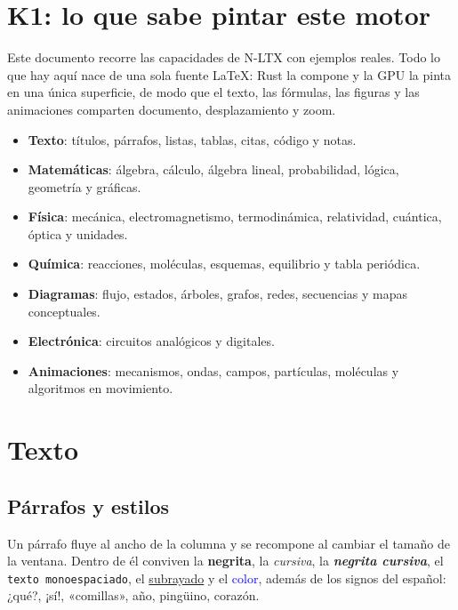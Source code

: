 \usetikzlibrary{arrows.meta,positioning,shapes.geometric,shapes.misc,calc,fit,backgrounds}
\usetikzlibrary{decorations.pathmorphing,decorations.markings,automata,mindmap,trees,shadows}
\usetikzlibrary{lindenmayersystems}

\section{K1: lo que sabe pintar este motor}

Este documento recorre las capacidades de N-LTX con ejemplos reales. Todo lo que hay aquí nace de una sola fuente LaTeX: Rust la compone y la GPU la pinta en una única superficie, de modo que el texto, las fórmulas, las figuras y las animaciones comparten documento, desplazamiento y zoom.

\begin{itemize}
\item \textbf{Texto}: títulos, párrafos, listas, tablas, citas, código y notas.
\item \textbf{Matemáticas}: álgebra, cálculo, álgebra lineal, probabilidad, lógica, geometría y gráficas.
\item \textbf{Física}: mecánica, electromagnetismo, termodinámica, relatividad, cuántica, óptica y unidades.
\item \textbf{Química}: reacciones, moléculas, esquemas, equilibrio y tabla periódica.
\item \textbf{Diagramas}: flujo, estados, árboles, grafos, redes, secuencias y mapas conceptuales.
\item \textbf{Electrónica}: circuitos analógicos y digitales.
\item \textbf{Animaciones}: mecanismos, ondas, campos, partículas, moléculas y algoritmos en movimiento.
\end{itemize}

\section{Texto}

\subsection{Párrafos y estilos}

Un párrafo fluye al ancho de la columna y se recompone al cambiar el tamaño de la ventana. Dentro de él conviven la \textbf{negrita}, la \emph{cursiva}, la \textbf{\emph{negrita cursiva}}, el \texttt{texto monoespaciado}, el \underline{subrayado} y el \textcolor{blue}{color}, además de los signos del español: ¿qué?, ¡sí!, «comillas», año, pingüino, corazón.


